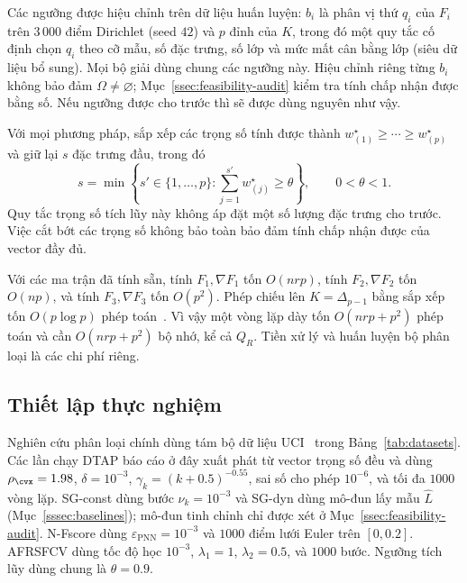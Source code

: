 Các ngưỡng được hiệu chỉnh trên dữ liệu huấn luyện: $b_i$ là phân vị thứ $q_i$ của $F_i$ trên $3\,000$ điểm Dirichlet (seed $42$) và $p$ đỉnh của $K$, trong đó một quy tắc cố định chọn $q_i$ theo cỡ mẫu, số đặc trưng, số lớp và mức mất cân bằng lớp (siêu dữ liệu bổ sung). Mọi bộ giải dùng chung các ngưỡng này. Hiệu chỉnh riêng từng $b_i$ không bảo đảm $\Omega\ne\varnothing$; Mục~\ref{ssec:feasibility-audit} kiểm tra tính chấp nhận được bằng số. Nếu ngưỡng được cho trước thì sẽ được dùng nguyên như vậy.

Với mọi phương pháp, sắp xếp các trọng số tính được thành $w^\star_{(1)}\ge\cdots\ge w^\star_{(p)}$ và giữ lại $s$ đặc trưng đầu, trong đó
\begin{equation}\label{eq:thetaRule}
s=\min\left\{s'\in\{1,\ldots,p\}:\sum_{j=1}^{s'}w^\star_{(j)}\ge\theta\right\},\qquad 0<\theta<1.
\end{equation}
Quy tắc trọng số tích lũy này không áp đặt một số lượng đặc trưng cho trước. Việc cắt bớt các trọng số không bảo toàn bảo đảm tính chấp nhận được của vector đầy đủ.

\begin{remark}\label{rem:fs-cost}
Với các ma trận đã tính sẵn, tính $F_1,\nabla F_1$ tốn $O(nrp)$, tính $F_2,\nabla F_2$ tốn $O(np)$, và tính $F_3,\nabla F_3$ tốn $O(p^2)$. Phép chiếu lên $K=\Delta_{p-1}$ bằng sắp xếp tốn $O(p\log p)$ phép toán~\citep{condat2016simplex}. Vì vậy một vòng lặp dày tốn $O(nrp+p^2)$ phép toán và cần $O(nrp+p^2)$ bộ nhớ, kể cả $Q_R$. Tiền xử lý và huấn luyện bộ phân loại là các chi phí riêng.
\end{remark}

\subsection{Thiết lập thực nghiệm}\label{ssec:setup}
Nghiên cứu phân loại chính dùng tám bộ dữ liệu UCI~\citep{kelly2023uci} trong Bảng~\ref{tab:datasets}. Các lần chạy DTAP báo cáo ở đây xuất phát từ vector trọng số đều và dùng $\rho_{\cvx}=1.98$, $\delta=10^{-3}$, $\gamma_k=(k+0.5)^{-0.55}$, sai số cho phép $10^{-6}$, và tối đa $1000$ vòng lặp. SG-const dùng bước $\nu_k=10^{-3}$ và SG-dyn dùng mô-đun lấy mẫu $\widehat L$ (Mục~\ref{sssec:baselines}); mô-đun tinh chỉnh chỉ được xét ở Mục~\ref{ssec:feasibility-audit}. N-Fscore dùng $\varepsilon_{\mathrm{PNN}}=10^{-3}$ và $1000$ điểm lưới Euler trên $[0,0.2]$. AFRSFCV dùng tốc độ học $10^{-3}$, $\lambda_1=1$, $\lambda_2=0.5$, và $1000$ bước. Ngưỡng tích lũy dùng chung là $\theta=0.9$.


